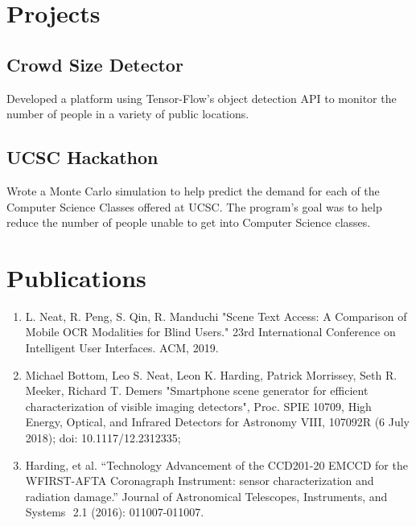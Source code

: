 \documentclass[letterpaper]{deedy-resume} %
\begin{document}
\begin{minipage}[t]{0.33\textwidth} %
\section{Projects}
\subsection{Crowd Size Detector}
	Developed a platform using Tensor-Flow's object detection API to monitor the number of people in a variety of public locations.
\sectionspace

\subsection{UCSC Hackathon}
	Wrote a Monte Carlo simulation to help predict the demand for each of the Computer Science Classes offered at UCSC. The program's goal was to help reduce the number of people unable to get into Computer Science classes.

\end{minipage} %
\hfill
\begin{minipage}[t]{0.66\textwidth} %



\section{Publications} 

\begin{enumerate}
	\item
	L. Neat, R. Peng, S. Qin, R. Manduchi "Scene Text Access: A Comparison of Mobile OCR Modalities for Blind Users." 23rd International Conference on Intelligent User Interfaces. ACM, 2019.
	
	\item
	Michael Bottom, Leo S. Neat, Leon K. Harding, Patrick Morrissey, Seth R. Meeker, Richard T. Demers  "Smartphone scene generator for efficient characterization of visible imaging detectors", Proc. SPIE 10709, High Energy, Optical, and Infrared Detectors for Astronomy VIII, 107092R (6 July 2018); doi: 10.1117/12.2312335;
	
	\item
	Harding, et al.  ``Technology Advancement of the CCD201-20 EMCCD for the WFIRST-AFTA Coronagraph Instrument: sensor characterization and radiation damage.'' Journal of Astronomical Telescopes, Instruments,  and Systems 
	​ 2.1 (2016): 011007-011007. 
\end{enumerate}

\end{minipage} %

\end{document}
